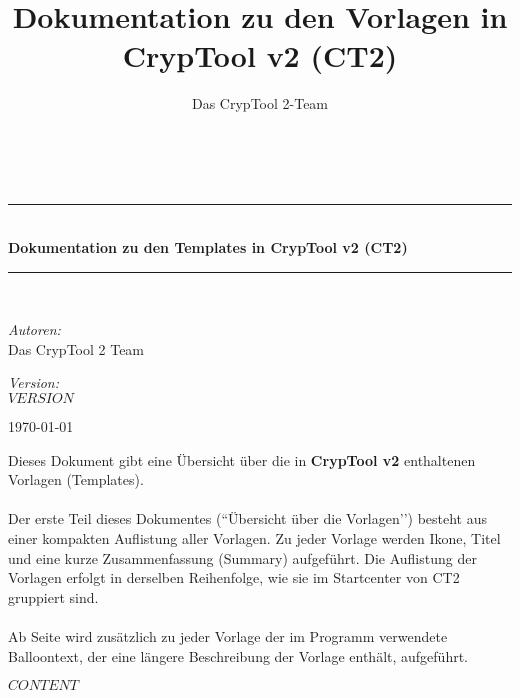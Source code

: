 \documentclass[10pt,a4paper]{scrreprt}
\title{Dokumentation zu den Vorlagen in CrypTool v2 (CT2)}
\author{Das CrypTool 2-Team}
\newcommand{\HRule}{\rule{\linewidth}{0.5mm}}
\begin{document}
\begin{titlepage}
\begin{center}
\hspace{0pt}\\[2.5cm]

\HRule \\[0.4cm]
{ \huge \bfseries Dokumentation zu den Templates in CrypTool v2 (CT2) }\\[0.4cm]
\HRule \\[1.5cm]

\begin{minipage}{0.4\textwidth}
\begin{flushleft} \large
\emph{Autoren:} \\
Das CrypTool 2 Team
\end{flushleft}
\end{minipage}
\begin{minipage}{0.4\textwidth}
\begin{flushright} \large
\emph{Version:} \\
$VERSION$
\end{flushright}
\end{minipage}
\vfill
{\large \today}
\end{center}
\newpage
\large
Dieses Dokument gibt eine Übersicht über die in {\bf CrypTool v2} enthaltenen Vorlagen (Templates).\\\\
Der erste Teil dieses Dokumentes (``Übersicht über die Vorlagen’’) besteht aus einer kompakten Auflistung aller Vorlagen. Zu jeder Vorlage werden Ikone, Titel und eine kurze Zusammenfassung (Summary) aufgeführt. Die Auflistung der Vorlagen erfolgt in derselben Reihenfolge, wie sie im Startcenter von CT2 gruppiert sind.\\\\
Ab Seite \pageref{part2} wird zusätzlich zu jeder Vorlage der im Programm verwendete Balloontext, der eine längere Beschreibung der Vorlage enthält, aufgeführt.
\newpage
\end{titlepage}

\tableofcontents
\newpage

$CONTENT$
\end{document}
